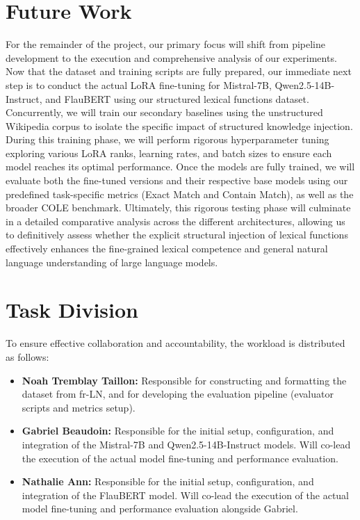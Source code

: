 \documentclass[11pt]{article}
\begin{document}
\section{Future Work}
For the remainder of the project, our primary focus will shift from pipeline development to the execution and comprehensive analysis of our experiments. Now that the dataset and training scripts are fully prepared, our immediate next step is to conduct the actual LoRA fine-tuning for Mistral-7B, Qwen2.5-14B-Instruct, and FlauBERT using our structured lexical functions dataset. Concurrently, we will train our secondary baselines using the unstructured Wikipedia corpus to isolate the specific impact of structured knowledge injection. During this training phase, we will perform rigorous hyperparameter tuning exploring various LoRA ranks, learning rates, and batch sizes to ensure each model reaches its optimal performance. Once the models are fully trained, we will evaluate both the fine-tuned versions and their respective base models using our predefined task-specific metrics (Exact Match and Contain Match), as well as the broader COLE benchmark. Ultimately, this rigorous testing phase will culminate in a detailed comparative analysis across the different architectures, allowing us to definitively assess whether the explicit structural injection of lexical functions effectively enhances the fine-grained lexical competence and general natural language understanding of large language models.

\section{Task Division}
To ensure effective collaboration and accountability, the workload is distributed as follows:
\begin{itemize}
    \item \textbf{Noah Tremblay Taillon:} Responsible for constructing and formatting the dataset from fr-LN, and for developing the evaluation pipeline (evaluator scripts and metrics setup).
    \item \textbf{Gabriel Beaudoin:} Responsible for the initial setup, configuration, and integration of the Mistral-7B and Qwen2.5-14B-Instruct models. Will co-lead the execution of the actual model fine-tuning and performance evaluation.
    \item \textbf{Nathalie Ann:} Responsible for the initial setup, configuration, and integration of the FlauBERT model. Will co-lead the execution of the actual model fine-tuning and performance evaluation alongside Gabriel.
\end{itemize}



%

\end{document}
